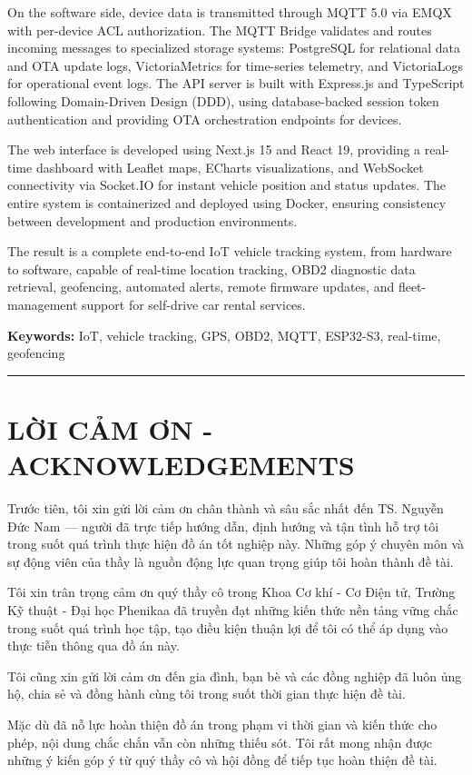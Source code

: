 \documentclass[13pt,a4paper]{extarticle}
\renewcommand{\\}{\thesislongtableorignewline\hline}%
\newcommand{\majorheading}[1]{\clearpage\section*{#1}}
\begin{document}
On the software side, device data is transmitted through MQTT 5.0 via
EMQX with per-device ACL authorization. The MQTT Bridge validates and
routes incoming messages to specialized storage systems: PostgreSQL for
relational data and OTA update logs, VictoriaMetrics for time-series
telemetry, and VictoriaLogs for operational event logs. The API server
is built with Express.js and TypeScript following Domain-Driven Design
(DDD), using database-backed session token authentication and providing
OTA orchestration endpoints for devices.

The web interface is developed using Next.js 15 and React 19, providing
a real-time dashboard with Leaflet maps, ECharts visualizations, and
WebSocket connectivity via Socket.IO for instant vehicle position and
status updates. The entire system is containerized and deployed using
Docker, ensuring consistency between development and production
environments.

The result is a complete end-to-end IoT vehicle tracking system, from
hardware to software, capable of real-time location tracking, OBD2
diagnostic data retrieval, geofencing, automated alerts, remote firmware
updates, and fleet-management support for self-drive car rental
services.

\textbf{Keywords:} IoT, vehicle tracking, GPS, OBD2, MQTT, ESP32-S3,
real-time, geofencing

\begin{center}\rule{0.5\linewidth}{0.5pt}\end{center}

\majorheading{LỜI CẢM ƠN - ACKNOWLEDGEMENTS}\label{lux1eddi-cux1ea3m-ux1a1n---acknowledgements}

Trước tiên, tôi xin gửi lời cảm ơn chân thành và sâu sắc nhất đến TS.
Nguyễn Đức Nam --- người đã trực tiếp hướng dẫn, định hướng và tận tình
hỗ trợ tôi trong suốt quá trình thực hiện đồ án tốt nghiệp này. Những
góp ý chuyên môn và sự động viên của thầy là nguồn động lực quan trọng
giúp tôi hoàn thành đề tài.

Tôi xin trân trọng cảm ơn quý thầy cô trong Khoa Cơ khí - Cơ Điện tử,
Trường Kỹ thuật - Đại học Phenikaa đã truyền đạt những kiến thức nền
tảng vững chắc trong suốt quá trình học tập, tạo điều kiện thuận lợi để
tôi có thể áp dụng vào thực tiễn thông qua đồ án này.

Tôi cũng xin gửi lời cảm ơn đến gia đình, bạn bè và các đồng nghiệp đã
luôn ủng hộ, chia sẻ và đồng hành cùng tôi trong suốt thời gian thực
hiện đề tài.

Mặc dù đã nỗ lực hoàn thiện đồ án trong phạm vi thời gian và kiến thức
cho phép, nội dung chắc chắn vẫn còn những thiếu sót. Tôi rất mong nhận
được những ý kiến góp ý từ quý thầy cô và hội đồng để tiếp tục hoàn
thiện đề tài.
\end{document}
